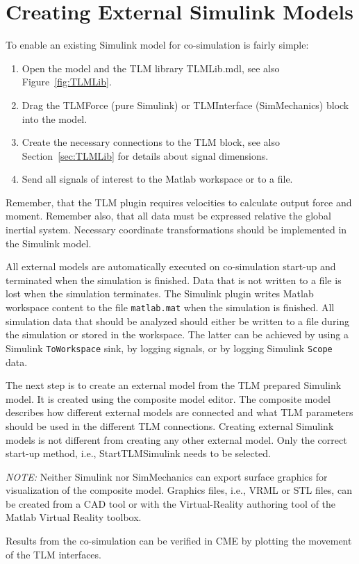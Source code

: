 \section{Creating External Simulink Models}
To enable an existing Simulink model for co-simulation is fairly simple:
\begin{enumerate}
\item Open the model and the TLM library TLMLib.mdl, see also Figure~\ref{fig:TLMLib}.
\item Drag the TLMForce (pure Simulink) or TLMInterface (SimMechanics) block into the model.
\item Create the necessary connections to the TLM block, see also Section~\ref{sec:TLMLib} for details about signal dimensions.
\item Send all signals of interest to the Matlab workspace or to a file.
\end{enumerate}

Remember, that the TLM plugin requires velocities to calculate output force and moment. 
Remember also, that all data must be expressed relative the global inertial system. 
Necessary coordinate transformations should be implemented in the Simulink model.

All external models are automatically executed on co-simulation start-up and terminated when the simulation is finished. 
Data that is not written to a file is lost when the simulation terminates. 
The Simulink plugin writes Matlab workspace content to the file {\tt matlab.mat} when the simulation is
finished. 
All simulation data that should be analyzed should either be written to a file during the simulation or stored in the workspace. 
The latter can be achieved by using a Simulink {\tt ToWorkspace} sink, by logging signals, or by logging Simulink {\tt Scope} data.

The next step is to create an external model from the TLM prepared Simulink model. 
It is created using the composite model editor. 
The composite model describes how different external models are connected and what TLM parameters should be used in the different TLM
connections. 
Creating external Simulink models is not different from creating any other external model. 
Only the correct start-up method, i.e., StartTLMSimulink needs to be selected.

{\em NOTE:} Neither Simulink nor SimMechanics can export surface graphics for visualization of the composite model. 
Graphics files, i.e., VRML or STL files, can be created from a CAD tool or with the Virtual-Reality authoring tool of the Matlab Virtual Reality toolbox.

Results from the co-simulation can be verified in CME by plotting the movement of the TLM interfaces.
